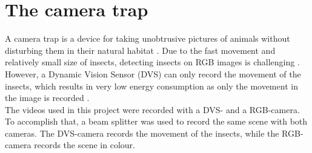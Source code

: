 \section{The camera trap}{
A camera trap is a device for taking unobtrusive pictures of animals without disturbing them in their natural habitat \cite{Swann2011}. Due to the fast movement and relatively small size of insects, detecting insects on RGB images is challenging \cite{Gebauer_2024_WACV}. However, a \glqq Dynamic Vision Sensor\grqq{} (DVS) can only record the movement of the insects, which results in very low energy consumption as only the movement in the image is recorded \cite{Gebauer_2024_WACV}. \\
The videos used in this project were recorded with a DVS- and a RGB-camera. To accomplish that, a beam splitter was used to record the same scene with both cameras. The DVS-camera records the movement of the insects, while the RGB-camera records the scene in colour.
}
